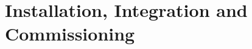 \section{Installation, Integration and Commissioning}
\label{sec:fdsp-slow-cryo-install}
\label{sec:fdgen-slow-cryo-install} %









